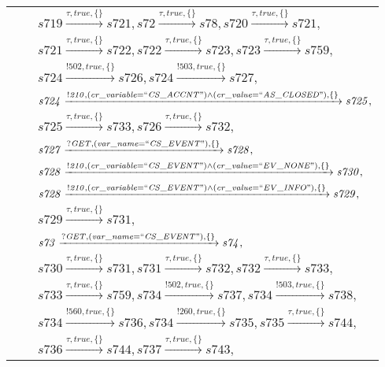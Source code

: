 \begin{tabular}{lcp{350px}}
& & $\mathit{s719}\xrightarrow{\mathit{\tau}, \mathit{true}, \{\}}\mathit{s721},\mathit{s72}\xrightarrow{\mathit{\tau}, \mathit{true}, \{\}}\mathit{s78},\mathit{s720}\xrightarrow{\mathit{\tau}, \mathit{true}, \{\}}\mathit{s721},$ \\
& & $\mathit{s721}\xrightarrow{\mathit{\tau}, \mathit{true}, \{\}}\mathit{s722},\mathit{s722}\xrightarrow{\mathit{\tau}, \mathit{true}, \{\}}\mathit{s723},\mathit{s723}\xrightarrow{\mathit{\tau}, \mathit{true}, \{\}}\mathit{s759},$ \\
& & $\mathit{s724}\xrightarrow{\mathit{!502}, \mathit{true}, \{\}}\mathit{s726},\mathit{s724}\xrightarrow{\mathit{!503}, \mathit{true}, \{\}}\mathit{s727},$ \\
& & $\mathit{s724}\xrightarrow{\mathit{!210}, \mathit{(cr\_variable = ``CS\_ACCNT") \land (cr\_value = ``AS\_CLOSED")}, \{\}}\mathit{s725},$ \\
& & $\mathit{s725}\xrightarrow{\mathit{\tau}, \mathit{true}, \{\}}\mathit{s733},\mathit{s726}\xrightarrow{\mathit{\tau}, \mathit{true}, \{\}}\mathit{s732},$ \\
& & $\mathit{s727}\xrightarrow{\mathit{?GET}, \mathit{(var\_name = ``CS\_EVENT")}, \{\}}\mathit{s728},$ \\
& & $\mathit{s728}\xrightarrow{\mathit{!210}, \mathit{(cr\_variable = ``CS\_EVENT") \land (cr\_value = ``EV\_NONE")}, \{\}}\mathit{s730},$ \\
& & $\mathit{s728}\xrightarrow{\mathit{!210}, \mathit{(cr\_variable = ``CS\_EVENT") \land (cr\_value = ``EV\_INFO")}, \{\}}\mathit{s729},$ \\
& & $\mathit{s729}\xrightarrow{\mathit{\tau}, \mathit{true}, \{\}}\mathit{s731},$ \\
& & $\mathit{s73}\xrightarrow{\mathit{?GET}, \mathit{(var\_name = ``CS\_EVENT")}, \{\}}\mathit{s74},$ \\
& & $\mathit{s730}\xrightarrow{\mathit{\tau}, \mathit{true}, \{\}}\mathit{s731},\mathit{s731}\xrightarrow{\mathit{\tau}, \mathit{true}, \{\}}\mathit{s732},\mathit{s732}\xrightarrow{\mathit{\tau}, \mathit{true}, \{\}}\mathit{s733},$ \\
& & $\mathit{s733}\xrightarrow{\mathit{\tau}, \mathit{true}, \{\}}\mathit{s759},\mathit{s734}\xrightarrow{\mathit{!502}, \mathit{true}, \{\}}\mathit{s737},\mathit{s734}\xrightarrow{\mathit{!503}, \mathit{true}, \{\}}\mathit{s738},$ \\
& & $\mathit{s734}\xrightarrow{\mathit{!560}, \mathit{true}, \{\}}\mathit{s736},\mathit{s734}\xrightarrow{\mathit{!260}, \mathit{true}, \{\}}\mathit{s735},\mathit{s735}\xrightarrow{\mathit{\tau}, \mathit{true}, \{\}}\mathit{s744},$ \\
& & $\mathit{s736}\xrightarrow{\mathit{\tau}, \mathit{true}, \{\}}\mathit{s744},\mathit{s737}\xrightarrow{\mathit{\tau}, \mathit{true}, \{\}}\mathit{s743},$ \\
\end{tabular}

